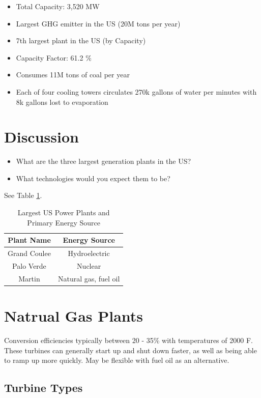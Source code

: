\documentclass[12pt, a4paper]{report}
\begin{document}
  \begin{itemize}
    \item Total Capacity: 3,520 MW
    \item Largest GHG emitter in the US (20M tons per year)
    \item 7th largest plant in the US (by Capacity)
    \item Capacity Factor: 61.2 \%
    \item Consumes 11M tons of coal per year
    \item Each of four cooling towers circulates 270k gallons of water per minutes with 8k gallons lost to evaporation
  \end{itemize}

  \section{Discussion}

  \begin{itemize}
    \item What are the three largest generation plants in the US?
    \item What technologies would you expect them to be?
  \end{itemize}

  See Table \ref{tab:4.1}.

  \begin{table}
    \centering
    \begin{tabular}{c c}
      Plant Name & Energy Source \\
      \hline
      Grand Coulee & Hydroelectric \\
      Palo Verde & Nuclear \\
      Martin & Natural gas, fuel oil
    \end{tabular}
    \caption{Largest US Power Plants and Primary Energy Source}
    \label{tab:4.1}
  \end{table}

  \section{Natrual Gas Plants}

  Conversion efficiencies typically between 20 - 35\% with temperatures of 2000 F. These turbines can generally start up and shut down faster, as well as being able to ramp up more quickly. May be flexible with fuel oil as an alternative.

  \subsection{Turbine Types}
\end{document}
